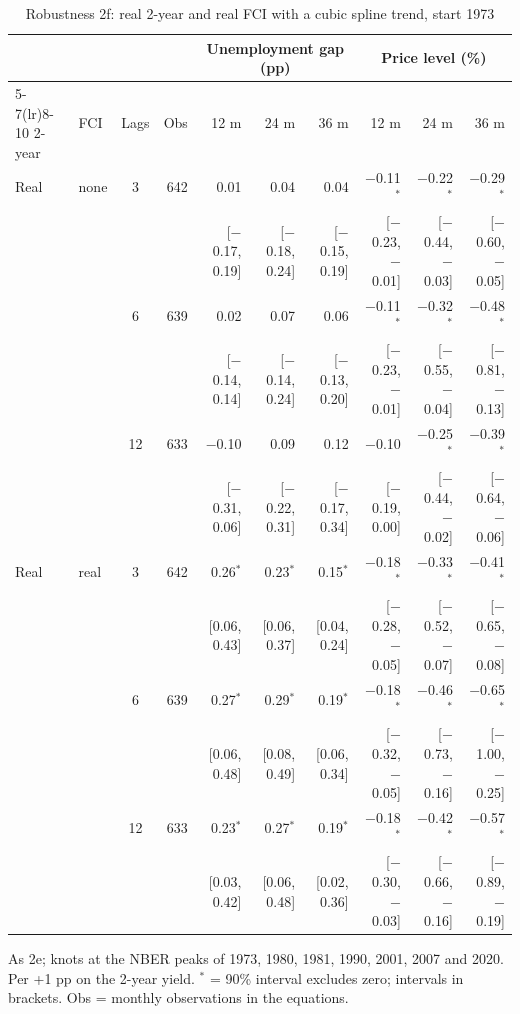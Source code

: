 \begin{table}[p]\centering\footnotesize\setlength{\tabcolsep}{2.2pt}
\caption{Robustness 2f: real 2-year and real FCI with a cubic spline trend, start 1973}\label{tab:R2f}
\begin{tabular}{llcrrrrrrr}\toprule
 & & & & \multicolumn{3}{c}{Unemployment gap (pp)} & \multicolumn{3}{c}{Price level (\%)}\\ \cmidrule(lr){5-7}\cmidrule(lr){8-10}
2-year & FCI & Lags & Obs & 12 m & 24 m & 36 m & 12 m & 24 m & 36 m\\ \midrule
Real & none & 3 & 642 & 0.01 & 0.04 & 0.04 & $-$0.11$^{*}$ & $-$0.22$^{*}$ & $-$0.29$^{*}$\\
 & & & & {\scriptsize [$-$0.17, 0.19]} & {\scriptsize [$-$0.18, 0.24]} & {\scriptsize [$-$0.15, 0.19]} & {\scriptsize [$-$0.23, $-$0.01]} & {\scriptsize [$-$0.44, $-$0.03]} & {\scriptsize [$-$0.60, $-$0.05]}\\
 &  & 6 & 639 & 0.02 & 0.07 & 0.06 & $-$0.11$^{*}$ & $-$0.32$^{*}$ & $-$0.48$^{*}$\\
 & & & & {\scriptsize [$-$0.14, 0.14]} & {\scriptsize [$-$0.14, 0.24]} & {\scriptsize [$-$0.13, 0.20]} & {\scriptsize [$-$0.23, $-$0.01]} & {\scriptsize [$-$0.55, $-$0.04]} & {\scriptsize [$-$0.81, $-$0.13]}\\
 &  & 12 & 633 & $-$0.10 & 0.09 & 0.12 & $-$0.10 & $-$0.25$^{*}$ & $-$0.39$^{*}$\\
 & & & & {\scriptsize [$-$0.31, 0.06]} & {\scriptsize [$-$0.22, 0.31]} & {\scriptsize [$-$0.17, 0.34]} & {\scriptsize [$-$0.19, 0.00]} & {\scriptsize [$-$0.44, $-$0.02]} & {\scriptsize [$-$0.64, $-$0.06]}\\
Real & real & 3 & 642 & 0.26$^{*}$ & 0.23$^{*}$ & 0.15$^{*}$ & $-$0.18$^{*}$ & $-$0.33$^{*}$ & $-$0.41$^{*}$\\
 & & & & {\scriptsize [0.06, 0.43]} & {\scriptsize [0.06, 0.37]} & {\scriptsize [0.04, 0.24]} & {\scriptsize [$-$0.28, $-$0.05]} & {\scriptsize [$-$0.52, $-$0.07]} & {\scriptsize [$-$0.65, $-$0.08]}\\
 &  & 6 & 639 & 0.27$^{*}$ & 0.29$^{*}$ & 0.19$^{*}$ & $-$0.18$^{*}$ & $-$0.46$^{*}$ & $-$0.65$^{*}$\\
 & & & & {\scriptsize [0.06, 0.48]} & {\scriptsize [0.08, 0.49]} & {\scriptsize [0.06, 0.34]} & {\scriptsize [$-$0.32, $-$0.05]} & {\scriptsize [$-$0.73, $-$0.16]} & {\scriptsize [$-$1.00, $-$0.25]}\\
 &  & 12 & 633 & 0.23$^{*}$ & 0.27$^{*}$ & 0.19$^{*}$ & $-$0.18$^{*}$ & $-$0.42$^{*}$ & $-$0.57$^{*}$\\
 & & & & {\scriptsize [0.03, 0.42]} & {\scriptsize [0.06, 0.48]} & {\scriptsize [0.02, 0.36]} & {\scriptsize [$-$0.30, $-$0.03]} & {\scriptsize [$-$0.66, $-$0.16]} & {\scriptsize [$-$0.89, $-$0.19]}\\
\bottomrule\end{tabular}
\par\smallskip\parbox{0.96\linewidth}{\scriptsize As 2e; knots at the NBER peaks of 1973, 1980, 1981, 1990, 2001, 2007 and 2020. Per +1 pp on the 2-year yield. $^{*}$ = 90\% interval excludes zero; intervals in brackets. Obs = monthly observations in the equations.}
\end{table}
